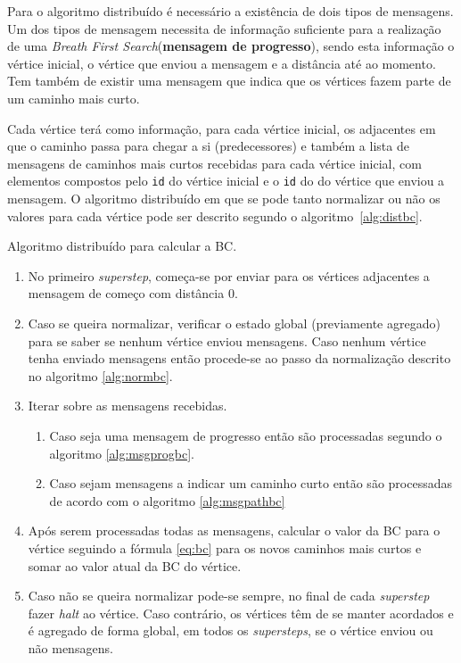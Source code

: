 Para o algoritmo distribuído é necessário a existência de dois tipos de 
mensagens. Um dos tipos de mensagem necessita de informação suficiente para a realização de uma \textit{Breath First Search}(\textbf{mensagem de progresso}), sendo esta 
informação o vértice inicial, o vértice que enviou a mensagem e a distância 
até ao momento. Tem também de existir 
uma mensagem que indica que os vértices fazem parte de um caminho mais curto. 

Cada vértice terá como informação, para cada vértice inicial, os adjacentes em que o caminho passa para chegar a si (predecessores) e também a 
lista de mensagens de caminhos mais curtos recebidas para cada vértice inicial, com elementos compostos pelo \verb|id| do vértice inicial e o \verb|id| do do vértice que enviou a mensagem. O algoritmo distribuído em que se pode tanto normalizar ou não os 
valores para cada vértice pode ser descrito segundo o algoritmo~\ref{alg:distbc}.

\begin{algorithm}
  \caption{Algoritmo distribuído para calcular a BC.}
  \label{alg:distbc}
  \begin{enumerate}  
    \item No primeiro \textit{superstep}, começa-se por enviar 
  para os vértices adjacentes a mensagem de começo com distância 0.
    \item Caso se queira normalizar, verificar o estado global (previamente 
agregado) para se saber se nenhum vértice enviou mensagens. Caso nenhum vértice 
tenha enviado mensagens então procede-se ao passo da normalização descrito no 
algoritmo \ref{alg:normbc}.
    \item Iterar sobre as mensagens recebidas.
    \begin{enumerate}
      \item Caso seja uma mensagem de progresso então são processadas segundo o 
algoritmo \ref{alg:msgprogbc}.
      \item Caso sejam mensagens a indicar um caminho curto então são 
processadas de acordo com o algoritmo \ref{alg:msgpathbc}
    \end{enumerate}
      \item Após serem processadas todas as mensagens, calcular o valor da 
BC para o vértice seguindo a fórmula \ref{eq:bc} para os novos caminhos mais 
curtos e somar ao valor atual da BC do vértice.
      \item Caso não se queira normalizar pode-se sempre, no final de cada 
\textit{superstep} fazer \textit{halt} ao vértice. Caso contrário, os vértices 
têm de se manter acordados e é agregado de forma global, em todos os 
\textit{supersteps}, se o vértice enviou ou não mensagens.
  \end{enumerate}
\end{algorithm}

